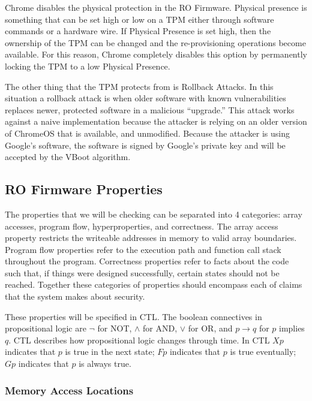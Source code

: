 \documentclass[../report.tex]{subfiles}
\begin{document}
Chrome disables the physical protection in the RO Firmware.
Physical presence is something that can be set high or low on a TPM either through software commands or a hardware wire. 
If Physical Presence is set high, then the ownership of the TPM can be changed and the re-provisioning operations become available.
For this reason, Chrome completely disables this option by permanently locking the TPM to a low Physical Presence\@.

The other thing that the TPM protects from is Rollback Attacks.
In this situation a rollback attack is when older software with known
vulnerabilities replaces newer, protected software in a malicious ``upgrade.''
This attack works against a naive implementation because the attacker is relying on an older version of ChromeOS that is available, and unmodified.
Because the attacker is using Google's software, the software is signed by Google's private key and will be accepted by the VBoot algorithm.

\subsection{RO Firmware Properties}

The properties that we will be checking can be separated into 4 categories: array accesses, program flow, hyperproperties, and correctness.
The array access property restricts the writeable addresses in memory to valid array boundaries. 
Program flow properties refer to the execution path and function call stack throughout the program.
Correctness properties refer to facts about the code such that, if things were
designed successfully, certain states should not be reached.
Together these categories of properties should encompass each of claims that the system makes about security.

These properties will be specified in CTL.
The boolean connectives in propositional logic are $\lnot$ for NOT, $\land$ for
AND, $\lor$ for OR, and $p \to q$ for $p$ implies $q$.
CTL describes how propositional logic changes through time.
In CTL $Xp$ indicates that $p$ is true in the next state; $Fp$ indicates that $p$ is true eventually; $Gp$ indicates that $p$ is always true.

\subsubsection{Memory Access Locations}
\end{document}
